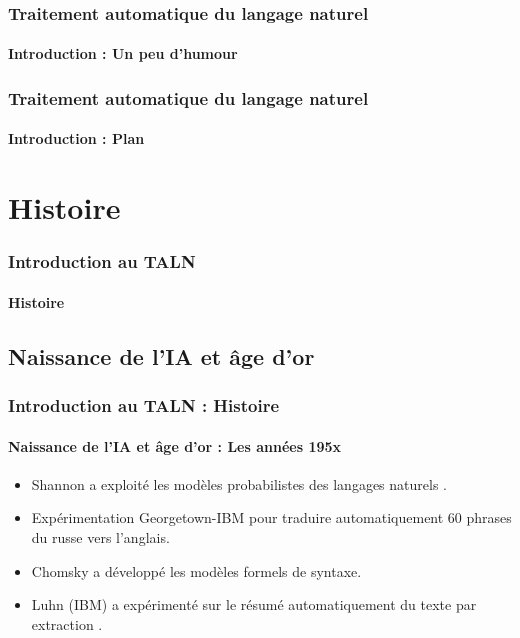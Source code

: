 \documentclass[xcolor=table]{beamer}
\begin{document}
\begin{frame}
\frametitle{Traitement automatique du langage naturel}
\framesubtitle{Introduction : Un peu d'humour}

\begin{center}
\end{center}

\end{frame}

\begin{frame}
\frametitle{Traitement automatique du langage naturel}
\framesubtitle{Introduction : Plan}

\begin{multicols}{2}
\tableofcontents
\end{multicols}
\end{frame}

\section{Histoire}

\begin{frame}
\frametitle{Introduction au TALN}
\framesubtitle{Histoire}


\end{frame}

\subsection{Naissance de l'IA et âge d'or}

\begin{frame}
\frametitle{Introduction au TALN : Histoire}
\framesubtitle{Naissance de l'IA et âge d'or : Les années 195x}

\begin{itemize}
	\item {} Shannon a exploité les modèles probabilistes des langages naturels \cite{1951-shannon}.
	\item {} Expérimentation Georgetown-IBM pour traduire automatiquement 60 phrases du russe vers l'anglais.
	\item {} Chomsky a développé les modèles formels de syntaxe.
	\item {} Luhn (IBM) a expérimenté sur le résumé automatiquement du texte par extraction \cite{1958-luhn}.
\end{itemize}

\end{frame}
\end{document}
